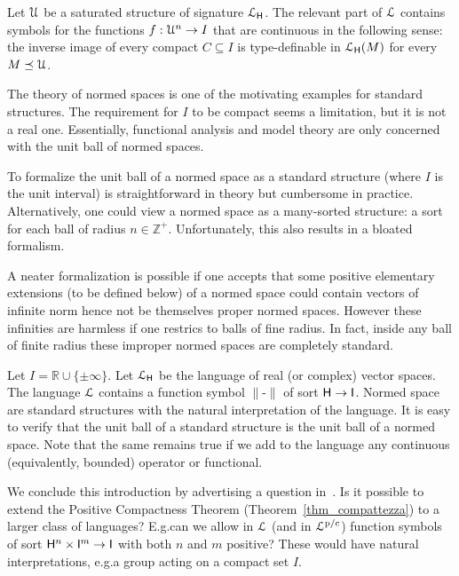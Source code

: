 \documentclass{amsproc}
\begin{document}
\begin{example}\label{ex_HPP}
  Let ${\EuScript U}$ be a saturated structure of signature ${\EuScript L}_{\sf H}$.
  The relevant part of ${\EuScript L}$ contains symbols for the functions $f:{\EuScript U}^n\to I$ that are continuous in the following sense: the inverse image of every compact $C\subseteq I$ is type-definable in ${\EuScript L}_{\sf H}(M)$ for every $M\preceq{\EuScript U}$.
\end{example}

The theory of normed spaces is one of the motivating examples for standard structures.
The requirement for $I$ to be compact seems a limitation, but it is not a real one.
Essentially, functional analysis and model theory are only concerned with the unit ball of normed spaces.

To formalize the unit ball of a normed space as a standard structure (where $I$ is the unit interval) is straightforward in theory but cumbersome in practice.
Alternatively, one could view a normed space as a many-sorted structure: a sort for each ball of radius $n\in\mathds{Z}^+$.
Unfortunately, this also results in a bloated formalism.

A neater formalization is possible if one accepts that some positive elementary extensions (to be defined below) of a normed space could contain vectors of infinite norm hence not be themselves proper normed spaces.
However these infinities are harmless if one restrics to balls of fine radius.
In fact, inside any ball of finite radius these improper normed spaces are completely standard.

\begin{example}\label{ex_normed_spaces}
Let $I=\mathds{R}\cup\{\pm\infty\}
$.
Let ${\EuScript L}_{\sf H}$ be the language of real (or complex) vector spaces.
The language ${\EuScript L}$ contains a function symbol $\|\mbox{-}\|$ of sort ${\sf H}\to {\sf I}$.
Normed space are standard structures with the natural interpretation of the language.
It is easy to verify that the unit ball of a standard structure is the unit ball of a normed space.
Note that the same remains true if we add to the language any continuous (equivalently, bounded) operator or functional.
\end{example}

We conclude this introduction by advertising a question in~\cite{clcl}.
Is it possible to extend the Positive Compactness Theorem (Theorem~\ref{thm_compattezza}) to a larger class of languages?
E.g.\@ can we allow in ${\EuScript L}$ (and in ${\EuScript L}^{\rm p/c}$) function symbols of sort ${\sf H}^n\times {\sf I}^m\to {\sf I}$ with both $n$ and $m$ positive?
These would have natural interpretations, e.g.\@ a group acting on a compact set $I$.
\end{document}
